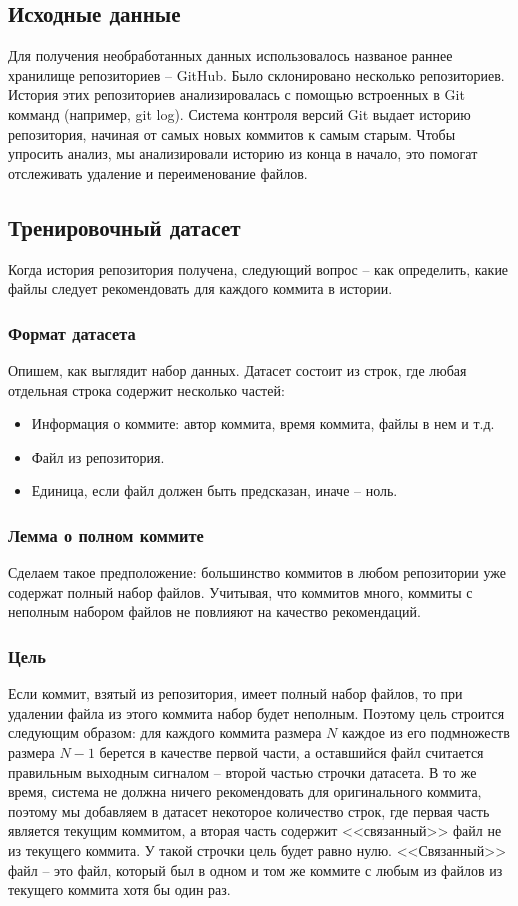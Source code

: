 \documentclass[times]{itmo-student-thesis}
\begin{document}
\subsection{Исходные данные}
Для получения необработанных данных использовалось названое раннее хранилище репозиториев -- GitHub. Было склонировано несколько репозиториев. История этих репозиториев анализировалась с помощью встроенных в Git комманд (например, git log). Система контроля версий Git выдает историю репозитория, начиная от самых новых коммитов к самым старым. Чтобы упросить анализ, мы анализировали историю из конца в начало, это помогат отслеживать удаление и переименование файлов.
\subsection{Тренировочный датасет}
Когда история репозитория получена, следующий вопрос -- как определить, какие файлы следует рекомендовать для каждого коммита в истории.
\subsubsection{Формат датасета}
Опишем, как выглядит набор данных. Датасет состоит из строк, где любая отдельная строка содержит несколько частей:
    \begin{itemize}
		\item Информация о коммите: автор коммита, время коммита, файлы в нем и т.д.
		\item Файл из репозитория.
		\item Единица, если файл должен быть предсказан, иначе -- ноль.
	\end{itemize}
\subsubsection{Лемма о полном коммите}
Сделаем такое предположение: большинство коммитов в любом репозитории уже содержат полный набор файлов. Учитывая, что коммитов много, коммиты с неполным набором файлов не повлияют на качество рекомендаций.
\subsubsection{Цель}
Если коммит, взятый из репозитория, имеет полный набор файлов, то при удалении файла из этого коммита набор будет неполным. Поэтому цель строится следующим образом: для каждого коммита размера $N$ каждое из его подмножеств размера $N - 1$ берется в качестве первой части, а оставшийся файл считается правильным выходным сигналом -- второй частью строчки датасета. В то же время, система не должна ничего рекомендовать для оригинального коммита, поэтому мы добавляем в датасет некоторое количество строк, где первая часть является текущим коммитом, а вторая часть содержит <<связанный>> файл не из текущего коммита. У такой строчки цель будет равно нулю. <<Связанный>> файл -- это файл, который был в одном и том же коммите с любым из файлов из текущего коммита хотя бы один раз.
\end{document}
